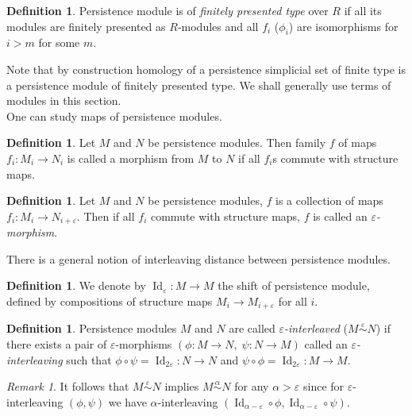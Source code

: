 \documentclass[english,12pt]{article}
\newcounter{stmcounter}[section]
\numberwithin{equation}{section}
\theoremstyle{definition}
\newtheorem{definition}[stmcounter]{Definition}
\theoremstyle{remark}
\newtheorem{remark}[stmcounter]{Remark}
\newcommand{\define}[1]{{\textit{#1}}}
\begin{document}
\begin{definition}
  Persistence module is of \define{finitely presented type} over $R$ if all its modules are finitely presented as $R$-modules and all $f_i$ ($\phi_i$) are isomorphisms for $i > m$ for some $m$.
\end{definition}

Note that by construction homology of a persistence simplicial set of finite type is a persistence module of finitely presented type. We shall generally use terms of modules in this section.\\

One can study maps of persistence modules. 

\begin{definition}
  Let $M$ and $N$ be persistence modules. Then family $f$ of maps $f_i : M_i \to N_i$ is called a morphism from $M$ to $N$ if all $f_i$s commute with structure maps.
\end{definition}

\begin{definition}
  Let $M$ and $N$ be persistence modules, $f$ is a collection of maps $f_i : M_i \to N_{i+\varepsilon}$. Then if all $f_i$ commute with structure maps, $f$ is called an \define{$\varepsilon$-morphism}.
\end{definition}

There is a general notion of interleaving distance between persistence modules.

\begin{definition}
  We denote by $\operatorname{Id}_{\varepsilon} : M \to M$ the shift of persistence module, defined by compositions of structure maps $M_i \to M_{i+\varepsilon}$ for all $i$.
\end{definition}

\begin{definition}
  Persistence modules $M$ and $N$ are called \define{$\varepsilon$-interleaved} ($M \stackrel{\varepsilon}{\sim} N$) if there exists a pair of $\varepsilon$-morphisms $(\phi : M \to N,\;\psi : N \to M)$ called an \define{$\varepsilon$-interleaving} such that $\phi \circ \psi = \operatorname{Id}_{2\varepsilon} : N \to N$ and $\psi \circ \phi = \operatorname{Id}_{2\varepsilon} : M \to M$.\\
\end{definition}

\begin{remark}
  It follows that $M \stackrel{\varepsilon}{\sim} N$ implies $M \stackrel{\alpha}{\sim} N$ for any $\alpha > \varepsilon$ since for $\varepsilon$-interleaving $(\phi, \psi)$ we have $\alpha$-interleaving $(\operatorname{Id}_{\alpha - \varepsilon} \circ \phi, \operatorname{Id}_{\alpha - \varepsilon} \circ \psi)$.
\end{remark}
\end{document}
